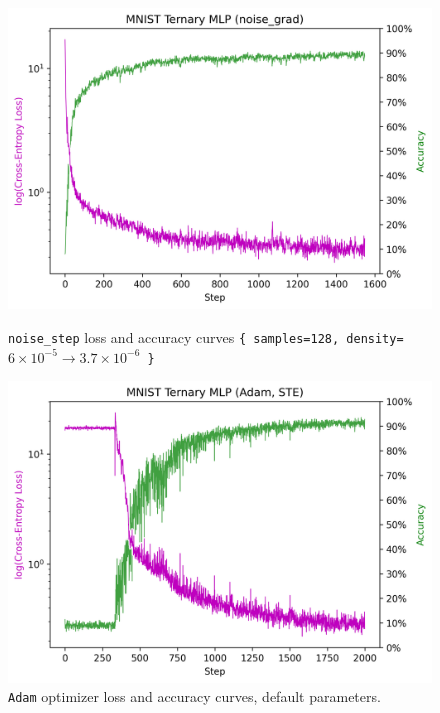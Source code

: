 \documentclass{article}
\begin{document}
\begin{figure}[h]
  \centering
  \begin{minipage}{0.45\textwidth}
    \centering
    \includegraphics[width=\textwidth]{mnist_bs1024_s128_spdynamic.png}
    \caption{\texttt{noise\_step} loss and accuracy curves \small{\texttt{\{~samples=128, density=$6 \times 10^{-5} \rightarrow 3.7 \times 10^{-6}$~\}}}}
    \label{fig:mnist_ng}
  \end{minipage}
  \hfill
  \begin{minipage}{0.45\textwidth}
    \centering
    \includegraphics[width=\textwidth]{mnist_bs1024_adam.png}
    \caption{\texttt{Adam} optimizer loss and accuracy curves, default parameters.}
    \label{fig:mnist_adam}
  \end{minipage}
\end{figure}
\end{document}
